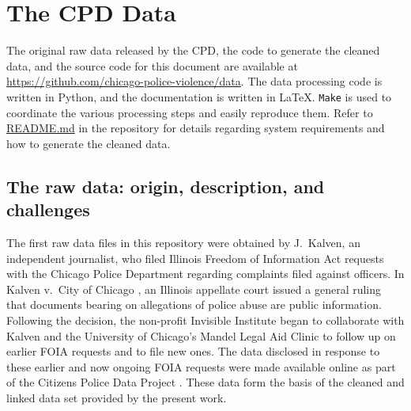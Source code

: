 \section{The CPD Data} \label{sec:data}
The original raw data released by the CPD, 
the code to generate the cleaned data, and the source code for this document 
are available at \url{https://github.com/chicago-police-violence/data}.
The data processing code is written in Python, and the documentation is written in \LaTeX.
\texttt{Make} is used to coordinate the various processing steps and easily reproduce them.
Refer to \url{README.md} in the repository for details regarding system requirements and 
how to generate the cleaned data.

\subsection{The raw data: origin, description, and challenges}
The first raw data files in this repository were obtained by J.~Kalven, an 
independent journalist, who filed Illinois Freedom of Information Act requests with 
the Chicago Police Department regarding complaints filed against officers. 
In Kalven v.~City of Chicago \cite{kalven2014}, an Illinois appellate court issued
a general ruling that documents bearing on allegations of
police abuse are public information. Following 
the decision, the non-profit
Invisible Institute began to collaborate with Kalven 
and the University of Chicago's Mandel Legal Aid
Clinic to follow up on earlier FOIA requests and to file new ones. The data
disclosed in response to these earlier and now ongoing FOIA requests were made available
online as part of the Citizens Police Data Project \cite{cpdp}.
These data form the basis of the cleaned and linked data set provided by the present work.

